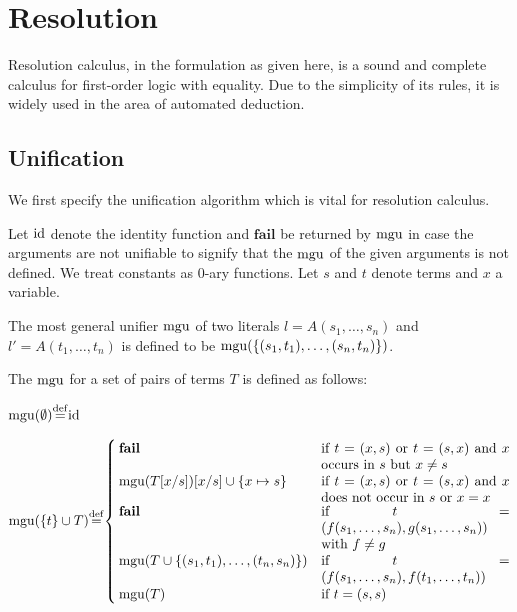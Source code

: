 

\section{Resolution}
\label{sec:resolution}

Resolution calculus, in the formulation as given here, is a sound and complete calculus for first-order logic with equality.
Due to the simplicity of its rules, it is widely used in the area of automated deduction.

\subsection{Unification}

We first specify the unification algorithm which is vital for resolution calculus.

Let $\operatorname{id}$ denote the identity function and $\textbf{fail}$ be returned by $\operatorname{mgu}$ in case the arguments are not unifiable to signify that the $\operatorname{mgu}$ of the given arguments is not defined. We treat constants as $0$-ary functions.
Let $s$ and $t$ denote terms and $x$ a variable.

The most general unifier $\operatorname{mgu}$ of two literals $l = A(s_1,\dotsc, s_n)$ and $l' = A(t_1,\dots, t_n)$ is defined to be $\operatorname{mgu}(\{ (s_1, t_1), \dotsc, (s_n, t_n)\})$.


The $\operatorname{mgu}$ for a set of pairs of terms $T$ is defined as follows:

\noindent
$
\mgu(\emptyset) \defeq \id
$

\newcommand{\aatahfdgasdfg}{.4\textwidth}
\noindent
$
\mbox{$\mgu(\{t\} \cup T)$} \defeq
\begin{cases}
	\mathbf{fail} 				& \parbox[t]{\aatahfdgasdfg}{if $t = (x, s)$ or $t=(s,x)$ and $x$ occurs in $s$ but $x\neq s$ } \\
	\mgu(T\subst{x/s})\subst{x/s} \cup \{x\mapsto s\} 		& \parbox[t]{\aatahfdgasdfg}{if $t = (x, s)$ or $t=(s,x)$ and $x$ does not occur in $s$ or $x=x$} \\
	\mathbf{fail} 				& \parbox[t]{\aatahfdgasdfg}{if $t = (f(s_1,\dotsc,s_n), g(s_1,\dotsc,s_n))$ with $f\neq g$} \\
	\mgu(T \cup \{(s_1, t_1), \dotsc, (t_n, s_n)\})		& \parbox[t]{\aatahfdgasdfg}{if $t = (f(s_1,\dotsc,s_n), f(t_1,\dotsc,t_n))$} \\
	\mgu(T) 							& \text{if $t=(s, s)$} \\
\end{cases}
$


